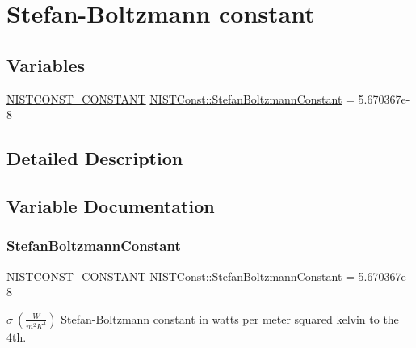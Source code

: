 \hypertarget{group___n_i_s_t_const-_stefan_boltzmann_constant}{}\section{Stefan-\/\+Boltzmann constant}
\label{group___n_i_s_t_const-_stefan_boltzmann_constant}
\subsection*{Variables}
\begin{DoxyCompactItemize}
\item 
\mbox{\hyperlink{_n_i_s_t_const_8hpp_a2b0fc1d7452373f816175dd86ce26729}{N\+I\+S\+T\+C\+O\+N\+S\+T\+\_\+\+C\+O\+N\+S\+T\+A\+NT}} \mbox{\hyperlink{group___n_i_s_t_const-_stefan_boltzmann_constant_ga7a87fa5e9ed3db503ee24f828d1dc700}{N\+I\+S\+T\+Const\+::\+Stefan\+Boltzmann\+Constant}} = 5.\+670367e-\/8
\end{DoxyCompactItemize}


\subsection{Detailed Description}


\subsection{Variable Documentation}
\mbox{\label{group___n_i_s_t_const-_stefan_boltzmann_constant_ga7a87fa5e9ed3db503ee24f828d1dc700}} 
\subsubsection{\texorpdfstring{Stefan\+Boltzmann\+Constant}{StefanBoltzmannConstant}}
{\footnotesize\ttfamily \mbox{\hyperlink{_n_i_s_t_const_8hpp_a2b0fc1d7452373f816175dd86ce26729}{N\+I\+S\+T\+C\+O\+N\+S\+T\+\_\+\+C\+O\+N\+S\+T\+A\+NT}} N\+I\+S\+T\+Const\+::\+Stefan\+Boltzmann\+Constant = 5.\+670367e-\/8}

$\sigma \ (\frac{W}{m^2 K^4})$ Stefan-\/\+Boltzmann constant in watts per meter squared kelvin to the 4th. 